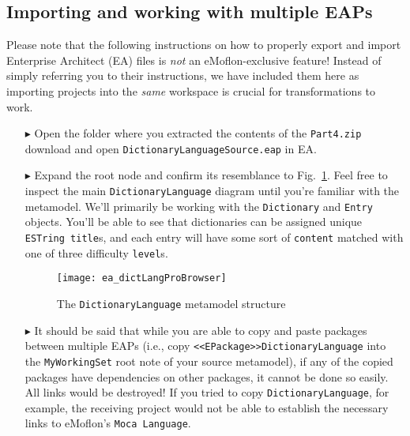 \newpage
\hypertarget{multiEAP}{}
\subsection{Importing and working with multiple EAPs}
\visHeader

Please note that the following instructions on how to properly export and import Enterprise Architect (EA) files is \emph{not} an eMoflon-exclusive feature!
Instead of simply referring you to their instructions, we have included them here as importing projects into the \emph{same} workspace is crucial for
transformations to work.

\begin{itemize}

\item[$\blacktriangleright$] Open the folder where you extracted the contents of the \texttt{Part4.zip} download and open \texttt{DictionaryLanguageSource.eap}
in EA.

\vspace{0.5cm}

\item[$\blacktriangleright$] Expand the root node and confirm its resemblance to Fig.~\ref{fig:dictionaryLangStart}. Feel free to inspect the main
\texttt{DictionaryLanguage} diagram until you're familiar with the metamodel. We'll primarily be working with the \texttt{Dictionary} and
\texttt{Entry} objects. You'll be able to see that dictionaries can be assigned unique \texttt{ESTring title}s, and each entry will have some sort of
\texttt{content} matched with one of three difficulty \texttt{level}s.

\vspace{0.5cm}

\begin{figure}[htbp]
\begin{center}
  \texttt{[image: ea\_dictLangProBrowser]}
  \caption{The \texttt{DictionaryLanguage} metamodel structure}
  \label{fig:dictionaryLangStart}
\end{center}
\end{figure}

\item[$\blacktriangleright$] It should be said that while you are able to copy and paste packages between multiple EAPs (i.e., copy
\texttt{<<EPack\-age>>DictionaryLanguage} into the \texttt{MyWorkingSet} root note of your source metamodel), if any of the copied packages have dependencies on
other packages, it cannot be done so easily. All links would be destroyed! If you tried to copy \texttt{DictionaryLanguage}, for example, the receiving project
would not be able to establish the necessary links to eMoflon's \texttt{Moca Language}.


\end{itemize}
